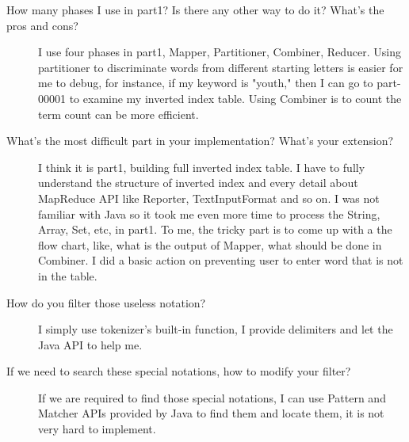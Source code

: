 \documentclass[12pt,a4paper]{article}
\begin{document}
\begin{description}
\item [How many phases I use in part1? Is there any other way to do it? 
What’s the pros and cons?] 
	I use four phases in part1, Mapper, Partitioner, Combiner, Reducer. Using partitioner to discriminate words from different starting letters is easier for me to debug, for instance, if my keyword is "youth," then I can go to part-00001 to examine my inverted index table. Using Combiner is to count the term count can be more efficient.
\item [What’s the most difficult part in your implementation? What’s your extension?] 
	I think it is part1, building full inverted index table. I have to fully understand the structure of inverted index and every detail about MapReduce API like Reporter, TextInputFormat and so on. I was not familiar with Java so it took me even more time to process the String, Array, Set, etc, in part1. To me, the tricky part is to come up with a the flow chart, like, what is the output of Mapper, what should be done in Combiner.
	I did a basic action on preventing user to enter word that is not in the table.
\item[How do you filter those useless notation?] I simply use tokenizer's built-in function, I provide delimiters and let the Java API to help me. 
\item[If we need to search these special notations, how to modify your filter?]
	If we are required to find those special notations, I can use Pattern and Matcher APIs provided by Java to find them and locate them, it is not very hard to implement.
\end{description}
\end{document}
